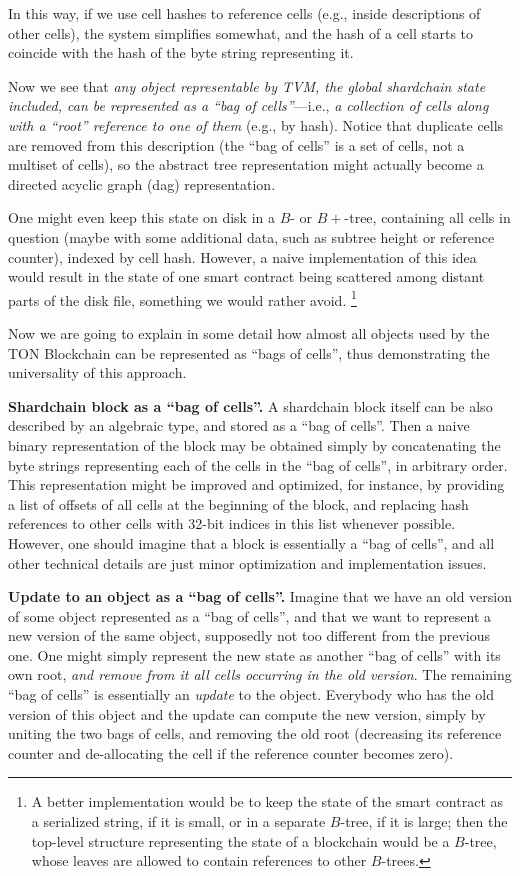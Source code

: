 \documentclass[12pt,oneside]{article}
\def\makepoint#1{\medbreak\noindent{\bf #1.\ }}
\def\nxsubpoint{\refstepcounter{subsubsection}%
  \smallbreak\makepoint{\thesubsubsection}}
\def\embt(#1.){\textbf{#1.}}
\begin{document}
In this way, if we use cell hashes to reference cells (e.g., inside
descriptions of other cells), the system simplifies somewhat, and the
hash of a cell starts to coincide with the hash of the byte string
representing it.

Now we see that {\em any object representable by TVM, the global
  shardchain state included, can be represented as a ``bag of
  cells''}---i.e., {\em a collection of cells along with a ``root''
  reference to one of them\/} (e.g., by hash). Notice that duplicate
cells are removed from this description (the ``bag of cells'' is a set
of cells, not a multiset of cells), so the abstract tree
representation might actually become a directed acyclic graph (dag)
representation.

One might even keep this state on disk in a $B$- or $B+$-tree,
containing all cells in question (maybe with some additional data,
such as subtree height or reference counter), indexed by cell
hash. However, a naive implementation of this idea would result in the
state of one smart contract being scattered among distant parts of the
disk file, something we would rather avoid.%
\footnote{A better implementation would be to keep the state of the
  smart contract as a serialized string, if it is small, or in a
  separate $B$-tree, if it is large; then the top-level structure
  representing the state of a blockchain would be a $B$-tree, whose
  leaves are allowed to contain references to other $B$-trees.}

Now we are going to explain in some detail how almost all objects used
by the TON Blockchain can be represented as ``bags of cells'', thus
demonstrating the universality of this approach.

\nxsubpoint \embt(Shardchain block as a ``bag of cells''.)  A
shardchain block itself can be also described by an algebraic type,
and stored as a ``bag of cells''. Then a naive binary representation
of the block may be obtained simply by concatenating the byte strings
representing each of the cells in the ``bag of cells'', in arbitrary
order. This representation might be improved and optimized, for
instance, by providing a list of offsets of all cells at the beginning
of the block, and replacing hash references to other cells with 32-bit
indices in this list whenever possible. However, one should imagine
that a block is essentially a ``bag of cells'', and all other
technical details are just minor optimization and implementation
issues.

\nxsubpoint\label{sp:obj.update} \embt(Update to an object as a ``bag
of cells''.)  Imagine that we have an old version of some object
represented as a ``bag of cells'', and that we want to represent a new
version of the same object, supposedly not too different from the
previous one. One might simply represent the new state as another
``bag of cells'' with its own root, {\em and remove from it all cells
  occurring in the old version}. The remaining ``bag of cells'' is
essentially an {\em update\/} to the object. Everybody who has the old
version of this object and the update can compute the new version,
simply by uniting the two bags of cells, and removing the old root
(decreasing its reference counter and de-allocating the cell if the
reference counter becomes zero).
\end{document}
